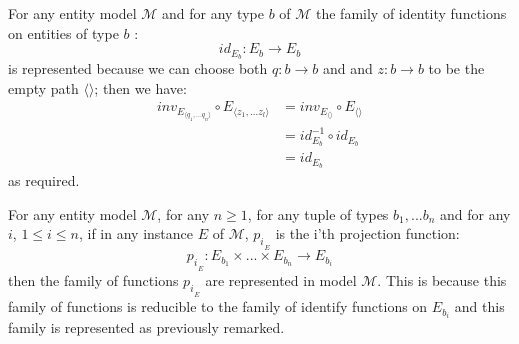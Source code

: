 \documentclass[10pt,a4paper]{article}
\newcommand{\genericmodel}{\mathcal{M}}
\begin{document}
\begin{remark}
For any entity model $\genericmodel$ and for any type $b$ of $\genericmodel$ the family of identity functions on 
entities of type $b$ :
$$
id_{E_b} : E_b \rightarrow E_b
$$
is represented because we can choose both $q: b \rightarrow b$ and and
$z: b \rightarrow b$ to be the empty path $\langle \rangle$; then we have:
\begin{align*}
inv_{E_{\langle q_1,...q_n\rangle}}\circ E_{\langle z_1,...z_l \rangle} & = inv_{E_{\langle \rangle}} \circ E_{\langle \rangle} \\
                                                                        & = id_{E_b}^{-1} \circ id_{E_b} \\
                                                                        & = id_{E_b} 
\end{align*}
as required.
\end{remark}
\begin{remark}
For any entity model $\genericmodel$, for any $n \geq 1$, for any tuple of types $b_1,...b_n$ and for any $i$, $1 \leq i \leq n$, if in any instance
$E$ of $\genericmodel$, ${p_i}_{_E}$ is the i'th projection function:
$$
{p_i}_{_E}: E_{b_1} \times ... \times E_{b_n} \rightarrow E_{b_i}
$$
then the family of functions ${p_i}_{_E}$ are represented in model $\genericmodel$. This is because this family of functions is reducible to the family of identify functions on $E_{b_i}$ and this family is represented as previously remarked.
\end{remark}
\end{document}
